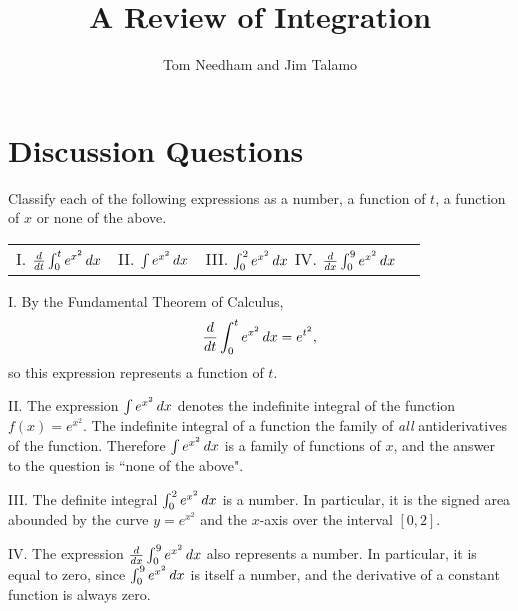 \documentclass[handout]{ximera}
\author{Tom Needham and Jim Talamo}
\title[]{A Review of Integration}
\begin{document}
\begin{abstract}
\end{abstract}
\maketitle

\vspace{-0.9in}

\section{Discussion Questions}

\begin{problem}
Classify each of the following expressions as a number, a function of $t$, a function of $x$ or none of the above.


\begin{tabular}{llll}
I. $\frac{\mathop{}\!d}{\mathop{}\!d t} \int_0^t e^{x^2} \mathop{}\!d x$ \hspace{0.2in} & II. $\int e^{x^2} \mathop{}\!d x$ \hspace{0.2in} & III. $\int_0^2 e^{x^2} \mathop{}\!d x$ \hspace{0.2in}
IV. $\frac{d}{dx} \int_0^9 e^{x^2} \mathop{}\!d x$
\end{tabular}

\end{problem}

\begin{freeResponse}
 I. By the Fundamental Theorem of Calculus, 
$$
\frac{\mathop{}\!d}{\mathop{}\!d t} \int_0^t e^{x^2} \mathop{}\!d x = e^{t^2},
$$
so this expression represents a function of $t$.

II. The expression $\int e^{x^2} \mathop{}\!d x$ denotes the indefinite integral of the function $f(x)=e^{x^2}$. The indefinite integral of a function the family of \textit{all} antiderivatives of the function. Therefore $\int e^{x^2} \mathop{}\!d x$ is a family of functions of $x$, and the answer to the question is ``none of the above".

III. The definite integral $\int_0^2 e^{x^2} \mathop{}\!d x$ is a number. In particular, it is the signed area abounded by the curve $y=e^{x^2}$ and the $x$-axis over the interval $[0,2]$. 

IV. The expression $\frac{d}{dx} \int_0^9 e^{x^2} \mathop{}\!d x$ also represents a number. In particular, it is equal to zero, since $\int_0^9 e^{x^2} \mathop{}\!d x$ is itself a number, and the derivative of a constant function is always zero.
\end{freeResponse}
\end{document}
